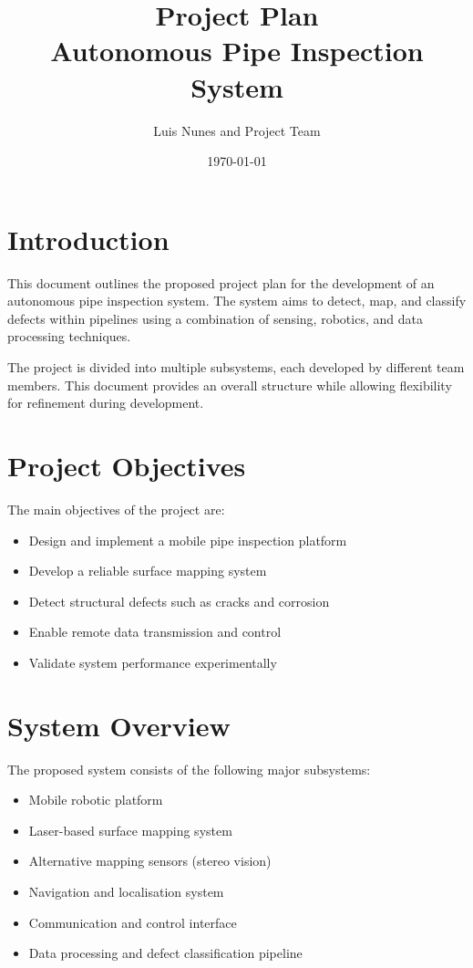 \documentclass[11pt,a4paper]{article}
\title{Project Plan\\
Autonomous Pipe Inspection System}
\author{Luis Nunes and Project Team}
\date{\today}
\begin{document}
\maketitle

\tableofcontents
\newpage

\section{Introduction}

This document outlines the proposed project plan for the development of an autonomous pipe inspection system. The system aims to detect, map, and classify defects within pipelines using a combination of sensing, robotics, and data processing techniques.

The project is divided into multiple subsystems, each developed by different team members. This document provides an overall structure while allowing flexibility for refinement during development.

\section{Project Objectives}

The main objectives of the project are:

\begin{itemize}
  \item Design and implement a mobile pipe inspection platform
  \item Develop a reliable surface mapping system
  \item Detect structural defects such as cracks and corrosion
  \item Enable remote data transmission and control
  \item Validate system performance experimentally
\end{itemize}

\section{System Overview}

The proposed system consists of the following major subsystems:

\begin{itemize}
  \item Mobile robotic platform
  \item Laser-based surface mapping system
  \item Alternative mapping sensors (stereo vision)
  \item Navigation and localisation system
  \item Communication and control interface
  \item Data processing and defect classification pipeline
\end{itemize}
\end{document}
